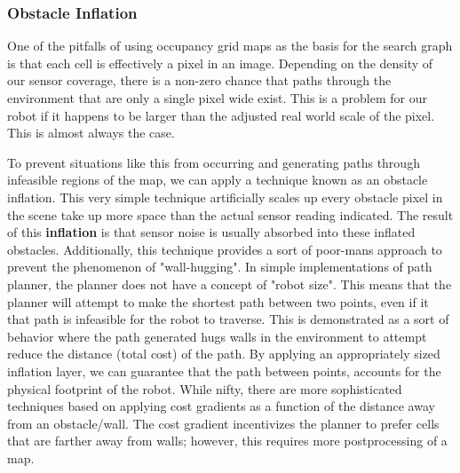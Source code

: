\subsubsection{Obstacle Inflation}

One of the pitfalls of using occupancy grid maps as the basis for the search graph is that each cell is effectively a pixel in an image. Depending on the density of our sensor coverage, there is a non-zero chance that paths through the environment that are only a single pixel wide exist. This is a problem for our robot if it happens to be larger than the adjusted real world scale of the pixel. This is almost always the case. 

To prevent situations like this from occurring and generating paths through infeasible regions of the map, we can apply a technique known as an obstacle inflation. This very simple technique artificially scales up every obstacle pixel in the scene take up more space than the actual sensor reading indicated. The result of this \textbf{inflation} is that sensor noise is usually absorbed into these inflated obstacles. Additionally, this technique provides a sort of poor-mans approach to prevent the phenomenon of "wall-hugging". In simple implementations of path planner, the planner does not have a concept of "robot size". This means that the planner will attempt to make the shortest path between two points, even if it that path is infeasible for the robot to traverse. This is demonstrated as a sort of behavior where the path generated hugs walls in the environment to attempt reduce the distance (total cost) of the path. By applying an appropriately sized inflation layer, we can guarantee that the path between points, accounts for the physical footprint of the robot. While nifty, there are more sophisticated techniques based on applying cost gradients as a function of the distance away from an obstacle/wall. The cost gradient incentivizes the planner to prefer cells that are farther away from walls; however, this requires more postprocessing of a map. 